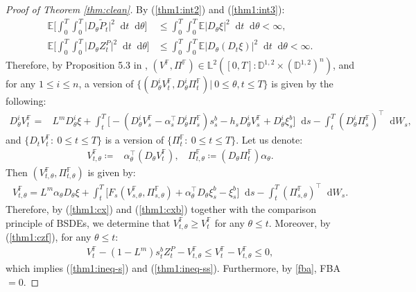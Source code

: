 \documentclass[a4paper, 11pt]{article}              %
\numberwithin{equation}{section}
\theoremstyle{plain}
\newcommand{\1}{\mathds{1}}
\newcommand{\pt}{\tilde{P}}
\newcommand{\dsE}{\mathbb{E}}
\newcommand{\dsF}{\mathbb{F}}
\newcommand{\dsL}{\mathbb{L}}
\newcommand{\dsD}{\mathbb{D}}
\theoremstyle{plain}
\theoremstyle{definition}
\theoremstyle{plain}
\newcommand*\df{\mathop{}\!\mathrm{d}}
\begin{document}
\begin{proof}[Proof of Theorem \ref{thm:clean}]
By (\ref{thm1:int2}) and (\ref{thm1:int3}):
\begin{align}
  \dsE\bigg[ \int_{0}^{T}\int_{0}^{T}\big|D_\theta\pt_t\big|^2\df t \df \theta\bigg]
  &\leq
     \int_{0}^{T}\int_{0}^{T}\dsE|D_\theta\xi|^2\df t \df \theta<\infty,\nonumber \\
  \dsE\bigg[ \int_{0}^{T}\int_{0}^{T}\big|D_\theta Z^P_t\big|^2\df t \df \theta\bigg]
  &\leq
     \int_{0}^{T}\int_{0}^{T}\dsE|D_\theta(D_t\xi)|^2\df t \df \theta<\infty.\nonumber 
\end{align}
Therefore, by Proposition 5.3 in \cite{el1997backward}, $(V^\dsF, \Pi^\dsF) \in
\dsL^2([0, T]:  \dsD^{1,2}\times (\dsD^{1,2})^n)$, and for any $1\leq i \leq n$, a
version of $\{(D^i_\theta V^\dsF_t, D^i_\theta \Pi^\dsF_t)| ~0\leq\theta, t \leq T\}$ is given by the following:
\begin{align}
  D^i_\theta V^\dsF_t=
  & L^mD^i_\theta \xi + \int_{t}^{T}\Big[ -(D^i_\theta V^\dsF_s
    - \alpha^\top_s D^i_\theta \Pi^\dsF_s)s^b_s -h_s D^i_\theta V^\dsF_s
    +D^i_\theta \xi^b_s \Big] \df s -\int_{t}^{T}(D^i_\theta \Pi^\dsF_s)^\top \df W_s, 
\end{align}
and $\{D_tV^\dsF_t\colon~0\leq t\leq T\}$ is a version of $\{\Pi^\dsF_t\colon~0\leq t\leq T\}$.
Let us denote:
\begin{align}
  V^\dsF_{t, \theta}\coloneqq& \alpha ^\top _\theta (D_\theta V^\dsF_t), ~~~~
  \Pi^\dsF_{t, \theta}\coloneqq (D_\theta \Pi^\dsF_t)\alpha_\theta.\nonumber 
\end{align}
Then $(V^\dsF_{t, \theta}, \Pi^\dsF_{t, \theta})$ is given by:
\begin{align}
V^\dsF_{t, \theta} = L^m\alpha _\theta D_\theta \xi+\int_{t}^{T}\Big[F_s(V^\dsF_{s,
  \theta},\Pi^\dsF_{s,\theta})
  +\alpha^\top_\theta D_\theta \xi^b_s - \xi^b_s  \Big]\df s - \int_{t}^{T}(\Pi^\dsF_{s,\theta})^\top\df
  W_s.\nonumber 
\end{align}
Therefore, by (\ref{thm1:cx}) and (\ref{thm1:cxb}) together with the comparison
principle of BSDEs, we determine that $V^\dsF_{t, \theta} \geq V^\dsF_t$ for any $\theta \leq
t$. Moreover, by (\ref{thm1:czf}), for any $\theta \leq t$:
\begin{align}
 V^\dsF_t  -(1-L^m)s^b_tZ^P_t-V^\dsF_{t, \theta}\leq V^\dsF_t  -V^\dsF_{t, \theta}
  \leq0,\nonumber 
\end{align}
which implies (\ref{thm1:ineq-s}) and (\ref{thm1:ineq-ss}). Furthermore, by
\cref{fba}, FBA$=0$. 
\end{proof}
\end{document}
